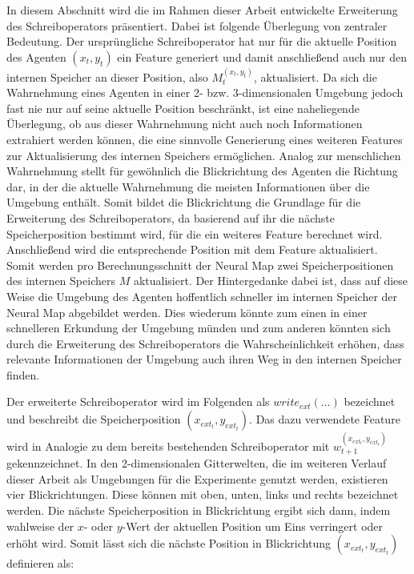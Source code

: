 In diesem Abschnitt wird die im Rahmen dieser Arbeit entwickelte Erweiterung des Schreiboperators präsentiert. Dabei ist folgende Überlegung von zentraler Bedeutung. Der ursprüngliche Schreiboperator hat nur für die aktuelle Position des Agenten $(x_t,y_t)$ ein Feature generiert und damit anschließend auch nur den internen Speicher an dieser Position, also $M_t^{(x_t,y_t)}$, aktualisiert. Da sich die Wahrnehmung eines Agenten in einer 2- bzw. 3-dimensionalen Umgebung jedoch fast nie nur auf seine aktuelle Position beschränkt, ist eine naheliegende Überlegung, ob aus dieser Wahrnehmung nicht auch noch Informationen extrahiert werden können, die eine sinnvolle Generierung eines weiteren Features zur Aktualisierung des internen Speichers ermöglichen. Analog zur menschlichen Wahrnehmung stellt für gewöhnlich die Blickrichtung des Agenten die Richtung dar, in der die aktuelle Wahrnehmung die meisten Informationen über die Umgebung enthält. Somit bildet die Blickrichtung die Grundlage für die Erweiterung des Schreiboperators, da basierend auf ihr die nächste Speicherposition bestimmt wird, für die ein weiteres Feature berechnet wird. Anschließend wird die entsprechende Position mit dem Feature aktualisiert. Somit werden pro Berechnungsschnitt der Neural Map zwei Speicherpositionen des internen Speichers $M$ aktualisiert. Der Hintergedanke dabei ist, dass auf diese Weise die Umgebung des Agenten hoffentlich schneller im internen Speicher der Neural Map abgebildet werden. Dies wiederum könnte zum einen in einer schnelleren Erkundung der Umgebung münden und zum anderen könnten sich durch die Erweiterung des Schreiboperators die Wahrscheinlichkeit erhöhen, dass relevante Informationen der Umgebung auch ihren Weg in den internen Speicher finden.

Der erweiterte Schreiboperator wird im Folgenden als $write_{ext}(\dots)$ bezeichnet und beschreibt die Speicherposition $(x_{ext_t},y_{ext_t})$. Das dazu verwendete Feature wird in Analogie zu dem bereits bestehenden Schreiboperator mit $w_{t+1}^{(x_{ext_t},y_{ext_t})}$ gekennzeichnet. In den 2-dimensionalen Gitterwelten, die im weiteren Verlauf dieser Arbeit als Umgebungen für die Experimente genutzt werden, existieren vier Blickrichtungen. Diese können mit oben, unten, links und rechts bezeichnet werden. Die nächste Speicherposition in Blickrichtung ergibt sich dann, indem wahlweise der $x$- oder $y$-Wert der aktuellen Position um Eins verringert oder erhöht wird. Somit lässt sich die nächste Position in Blickrichtung $(x_{ext_t},y_{ext_t})$ definieren als:

